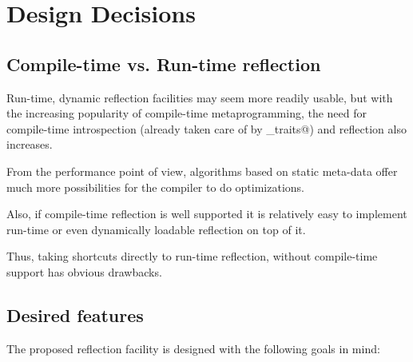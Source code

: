 \section{Design Decisions}

\subsection{Compile-time vs. Run-time reflection}

Run-time, dynamic reflection facilities may seem more readily
usable, but with the increasing popularity of compile-time metaprogramming,
the need for compile-time introspection (already taken care of
by \verb@type_traits@) and reflection also increases.

From the performance point of view, algorithms based on static
meta-data offer much more possibilities for the compiler to do
optimizations.

Also, if compile-time reflection is well supported it is relatively
easy to implement run-time or even dynamically loadable reflection
on top of it.

Thus, taking shortcuts directly to run-time reflection, without
compile-time support has obvious drawbacks.

\subsection{Desired features} 

The proposed reflection facility is designed with the following
goals in mind:

